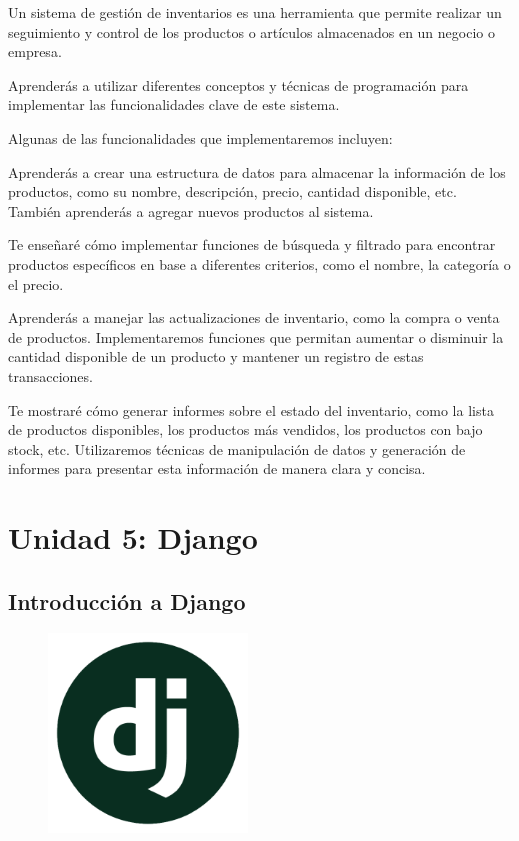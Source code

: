 \documentclass[
  a4paper,
  DIV=11,
  numbers=noendperiod,
  onepage,
  openany]{scrreprt}
\begin{document}
\begin{tcolorbox}
Un sistema de gestión de inventarios es una herramienta que permite
realizar un seguimiento y control de los productos o artículos
almacenados en un negocio o empresa.

Aprenderás a utilizar diferentes conceptos y técnicas de programación
para implementar las funcionalidades clave de este sistema.

Algunas de las funcionalidades que implementaremos incluyen:

Aprenderás a crear una estructura de datos para almacenar la información
de los productos, como su nombre, descripción, precio, cantidad
disponible, etc. También aprenderás a agregar nuevos productos al
sistema.

Te enseñaré cómo implementar funciones de búsqueda y filtrado para
encontrar productos específicos en base a diferentes criterios, como el
nombre, la categoría o el precio.

Aprenderás a manejar las actualizaciones de inventario, como la compra o
venta de productos. Implementaremos funciones que permitan aumentar o
disminuir la cantidad disponible de un producto y mantener un registro
de estas transacciones.

Te mostraré cómo generar informes sobre el estado del inventario, como
la lista de productos disponibles, los productos más vendidos, los
productos con bajo stock, etc. Utilizaremos técnicas de manipulación de
datos y generación de informes para presentar esta información de manera
clara y concisa.

\part{Unidad 5: Django}

\chapter{Introducción a Django}\label{introducciuxf3n-a-django}

\begin{figure}[H]

{\centering \includegraphics[width=2.08333in,height=\textheight]{images/django-logo.png}

}
\end{figure}
\end{tcolorbox}
\end{document}
